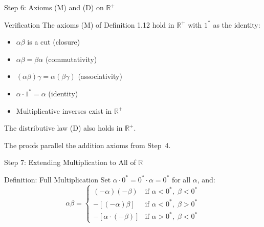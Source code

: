 \documentclass[aspectratio=169,12pt,t]{beamer}
\begin{document}
{\begin{frame}{Step 6: Axioms (M) and (D) on $\mathbb{R}^+$}
  \begin{proofblock}{Verification}
    The axioms (M) of Definition 1.12 hold in $\mathbb{R}^+$ with $1^*$ as the
    identity:
    \begin{itemize}
      \item[(M1)] $\alpha\beta$ is a cut (closure)
      \item[(M2)] $\alpha\beta = \beta\alpha$ (commutativity)
      \item[(M3)] $(\alpha\beta)\gamma = \alpha(\beta\gamma)$ (associativity)
      \item[(M4)] $\alpha \cdot 1^* = \alpha$ (identity)
      \item[(M5)] Multiplicative inverses exist in $\mathbb{R}^+$
    \end{itemize}

    \vspace{0.3em}
    The distributive law (D) also holds in $\mathbb{R}^+$.
  \end{proofblock}

  \vspace{0.3em}
  \begin{hlbox}
    The proofs parallel the addition axioms from Step~4.
  \end{hlbox}

\end{frame}

\begin{frame}{Step 7: Extending Multiplication to All of $\mathbb{R}$}
  \begin{defblock}{Definition: Full Multiplication}
    Set $\alpha \cdot 0^* = 0^* \cdot \alpha = 0^*$ for all $\alpha$, and:
    \[
      \alpha\beta = \begin{cases}
        (-\alpha)(-\beta)
          & \text{if } \alpha < 0^*,\; \beta < 0^* \\[4pt]
        -[(-\alpha)\beta]
          & \text{if } \alpha < 0^*,\; \beta > 0^* \\[4pt]
        -[\alpha \cdot (-\beta)]
          & \text{if } \alpha > 0^*,\; \beta < 0^*
      \end{cases}
    \]
  \end{defblock}


\end{frame}}
\end{document}
